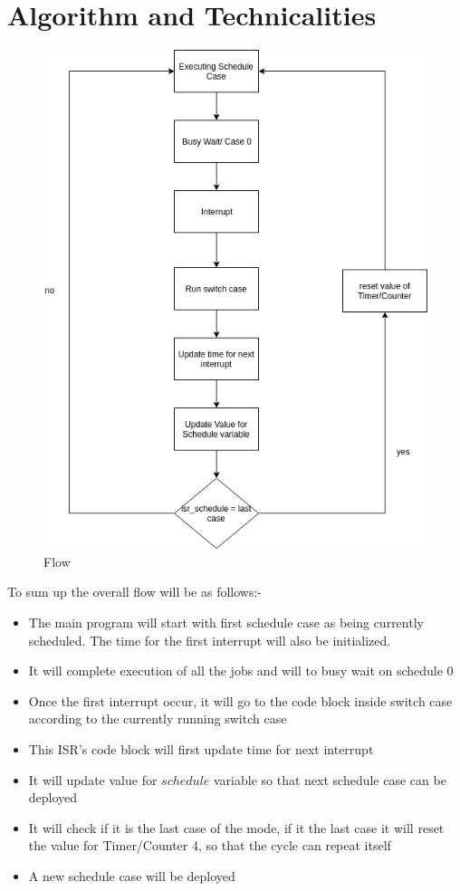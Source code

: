 \documentclass[16pt]{report}
\begin{document}
\section{Algorithm and Technicalities}
\begin{figure}[H]
\centering
\includegraphics[width=\linewidth]{15flowChart.png}
\caption{Flow}
\end{figure}
To sum up the overall flow will be as follows:-
\begin{itemize}
    \item The main program will start with first schedule case as being currently scheduled. The time for the first interrupt will also be initialized.
    \item It will complete execution of all the jobs and will to busy wait on schedule 0
    \item Once the first interrupt occur, it will go to the code block inside switch case according to the currently running switch case
    \item This ISR's code block will first update time for next interrupt
    \item It will update value for $schedule$ variable so that next schedule case can be deployed
    \item It will check if it is the last case of the mode, if it the last case it will reset the value for Timer/Counter 4, so that the cycle can repeat itself
    \item A new schedule case will be deployed
\end{itemize}
\end{document}
